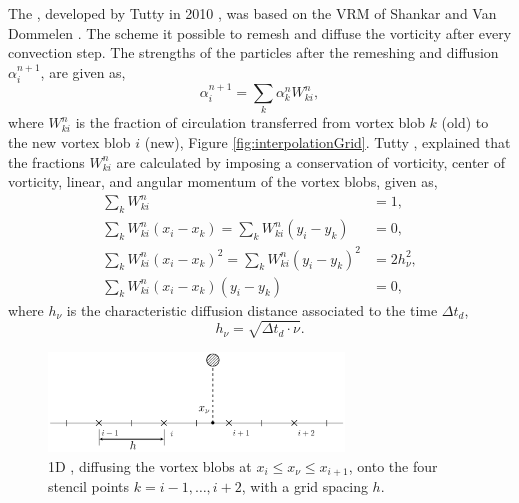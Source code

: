 The , developed by Tutty in 2010 \cite{Tutty2010a}, was based on the VRM of Shankar and Van Dommelen \cite{Shankar1996}. The scheme it possible to remesh and diffuse the vorticity after every convection step. The strengths of the particles after the remeshing and diffusion $\alpha_i^{n+1}$, are given as, 
	\begin{equation}
	\alpha_i^{n+1} = \sum_k \alpha_k^n W_{ki}^n, 
	\end{equation}
where $W_{ki}^n$ is the fraction of circulation transferred from vortex blob $k$ (old) to the new vortex blob $i$ (new), Figure \ref{fig:interpolationGrid}. Tutty \cite{Tutty2010a}, explained that the fractions $W_{ki}^n$ are calculated by imposing a conservation of vorticity, center of vorticity, linear, and angular momentum of the vortex blobs, given as,
	\begin{subequations}
	\begin{align}
	\sum_k W_{ki}^n &= 1, \\
	\sum_k W_{ki}^n(x_i - x_k) = \sum_k W_{ki}^n(y_i - y_k) &= 0, \\
	\sum_k W_{ki}^n(x_i - x_k)^2 = \sum_k W_{ki}^n(y_i - y_k)^2 &= 2h_{\nu}^2, \\
	\sum_k W_{ki}^n(x_i - x_k)(y_i - y_k) &= 0,	
	\end{align}
	\label{eq:la_VRMredistributions}
	\end{subequations}
where $h_{\nu}$ is the characteristic diffusion distance associated to the time $\Delta t_d$, 
	\begin{equation}
	h_{\nu} = \sqrt{\Delta t_d \cdot \nu}.
	\end{equation}	

	\begin{figure}[!b]
	\centering
	\includegraphics[width=0.7\textwidth]{figures/lagrangian/simpleRedistribution.pdf}
	\caption{1D , diffusing the vortex blobs at $x_i \leqslant x_{\nu} \leqslant x_{i+1}$, onto the four stencil points $k=i-1,\dots,i+2$, with a grid spacing $h$.}
	\label{fig:simpleRedistribution}
	\end{figure}
	
